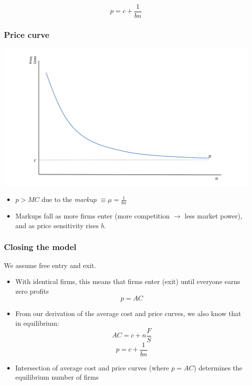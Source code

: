 \documentclass{beamer}
\begin{document}
\begin{frame}
	\footnotesize
\begin{equation}
p=c + \frac{1}{bn} \nonumber
\end{equation} 
	\frametitle{Price curve}
	\begin{center}
			\includegraphics[scale=0.25]{SL2_6.pdf}
	\end{center}

	\begin{itemize}
		\footnotesize
		\item $p>MC$ due to the \emph{markup} $\equiv \mu = \frac{1}{bn}$
		\item Markups fall as more firms enter (more competition $\rightarrow$ less market power), and as price sensitivity rises $b$.

	\end{itemize}
	
\end{frame}

\begin{frame}
\frametitle{Closing the model}
We assume free entry and exit.
	\begin{itemize}
		\item With identical firms, this means that firms enter (exit) until everyone earns zero profits
		\begin{equation}
		p = AC \nonumber
		\end{equation}
		\item From our derivation of the average cost and price curves, we also know that in equilibrium:
		$$AC=c+n\frac{F}{S}$$
		$$p=c+\frac{1}{bn}$$
		
		\item Intersection of average cost and price curves (where $p=AC$) determines the equilibrium number of firms
	\end{itemize}

	
\end{frame}
\end{document}
